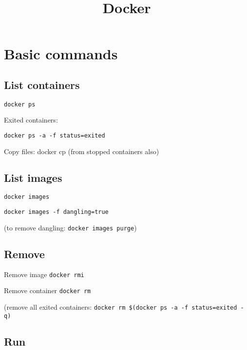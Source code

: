 


\title{Docker}


\date{}


\maketitle

\justify

\renewcommand{\abstractname}{}

\begin{abstract}

\end{abstract}



\section*{Basic commands}

\subsection*{List containers}

\texttt{docker ps}

Exited containers: 

\texttt{docker ps -a -f status=exited}

Copy files: docker cp
(from stopped containers also)


\subsection*{List images}

\texttt{docker images}

\texttt{docker images -f dangling=true}

(to remove dangling: \texttt{docker images purge})


\subsection*{Remove}

Remove image \texttt{docker rmi}

Remove container \texttt{docker rm}

(remove all exited containers: \texttt{docker rm \$(docker ps -a -f status=exited -q)}


\subsection*{Run}


